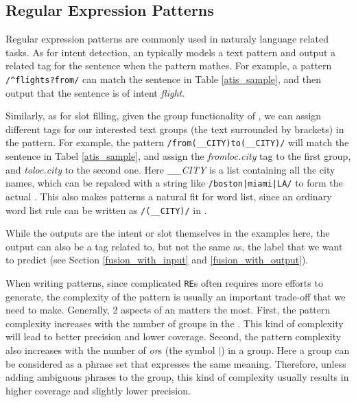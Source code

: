 \subsection{Regular Expression Patterns}
Regular expression patterns are commonly used in naturaly language related tasks. As for intent detection, an \RE typically models a text pattern and output a related tag for the sentence when the pattern mathes. For example, a pattern 
\texttt{/\textasciicircum flights?\:from/} can match the sentence in Table \ref{atis_sample}, and then output that the sentence is of intent \emph{flight}. 


Similarly, as for slot filling, given the group functionality of \RE, we can assign different tags for our interested text groups (the text surrounded by brackets) in the pattern. For example, the pattern \texttt{/from\:(\_\_CITY)\:to\:(\_\_CITY)/} will match the sentence in Tabel \ref{atis_sample}, and assign the \emph{fromloc.city} tag to the first group, and \emph{toloc.city} to the second one. Here \emph{\_\_CITY} is a list containing all the city names, which can be repalced with a string like \texttt{/boston|miami|LA/} to form the actual \RE. This also makes \RE patterns a natural fit for word list, since an ordinary word list rule can be written as \texttt{/(\_\_CITY)/} in \RE.

While the outputs are the intent or slot themselves in the examples here, the \RE output can also be a tag related to, but not the same as, the label that we want to predict (see Section \ref{fusion_with_input} and \ref{fusion_with_output}).

When writing \RE patterns, since complicated \texttt{RE}s often requires more efforts to generate, the complexity of the pattern is usually an important trade-off that we need to make. Generally, 2 aspects of an \RE matters the most. First, the pattern complexity increases with the number of groups in the \RE. This kind of complexity will lead to better precision and lower coverage. Second, the pattern complexity also increases with the number of \emph{or}s (the symbol $|$) in a group. Here a group can be considered as a phrase set that expresses the same meaning. Therefore, unless adding ambiguous phrases to the group, this kind of complexity usually results in higher coverage and slightly lower precision.   

